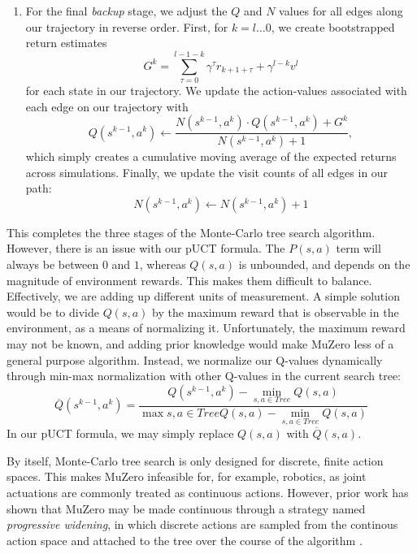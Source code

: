 \begin{enumerate}
    \item For the final \textit{backup} stage, we adjust the $Q$ and $N$ values for all edges along our trajectory in reverse order. First, for $k = l \dots 0$, we create bootstrapped return estimates
    \begin{equation*}
        G^k = \sum_{\tau=0}^{l - 1 - k} \gamma^\tau r_{k+1+\tau} + \gamma^{l - k} v^l
    \end{equation*}
    for each state in our trajectory. We update the action-values associated with each edge on our trajectory with
    \begin{equation*}
        Q \left(s^{k-1}, a^k\right) \leftarrow \frac{
            N \left(s^{k-1}, a^k \right) \cdot Q \left(s^{k-1}, a^k \right) + G^k
        }{
            N \left(s^{k-1}, a^k \right) + 1
        },
    \end{equation*}
    which simply creates a cumulative moving average of the expected returns across simulations. Finally, we update the visit counts of all edges in our path:
    \begin{equation*}
        N \left(s^{k-1}, a^k \right) \leftarrow  N \left(s^{k-1}, a^k \right) + 1
    \end{equation*}
\end{enumerate}

This completes the three stages of the Monte-Carlo tree search algorithm. However, there is an issue with our pUCT formula. The $P(s, a)$ term will always be between $0$ and $1$, whereas $Q(s, a)$ is unbounded, and depends on the magnitude of environment rewards. This makes them difficult to balance. Effectively, we are adding up different units of measurement. A simple solution would be to divide $Q(s, a)$ by the maximum reward that is observable in the environment, as a means of normalizing it. Unfortunately, the maximum reward may not be known, and adding prior knowledge would make MuZero less of a general purpose algorithm. Instead, we normalize our Q-values dynamically through min-max normalization with other Q-values in the current search tree:
\begin{equation*}
    \overline{Q} \left(s^{k-1}, a^k\right) = \frac{
        Q \left(s^{k-1}, a^k\right) - \min_{s, a \in Tree} Q(s, a)
    }{
        \max{s, a \in Tree} Q(s, a) - \min_{s, a \in Tree} Q(s, a)
    }
\end{equation*}
In our pUCT formula, we may simply replace $Q(s, a)$ with $\overline{Q}(s, a)$.

By itself, Monte-Carlo tree search is only designed for discrete, finite action spaces. This makes MuZero infeasible for, for example, robotics, as joint actuations are commonly treated as continuous actions. However, prior work has shown that MuZero may be made continuous through a strategy named \textit{progressive widening}, in which discrete actions are sampled from the continous action space and attached to the tree over the course of the algorithm \cite{continuous-muzero}.